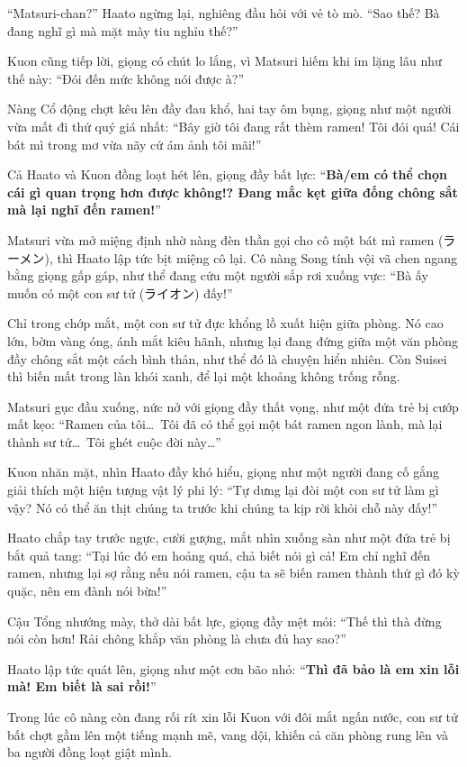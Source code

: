 \documentclass[../main.tex]{subfiles}
\begin{document}
``Matsuri-chan?'' Haato ngừng lại, nghiêng đầu hỏi với vẻ tò mò. ``Sao thế? Bà đang nghĩ gì mà mặt mày tiu nghỉu thế?''

Kuon cũng tiếp lời, giọng có chút lo lắng, vì Matsuri hiếm khi im lặng lâu như thế này: ``Đói đến mức không nói được à?''

Nàng Cổ động chợt kêu lên đầy đau khổ, hai tay ôm bụng, giọng như một người vừa mất đi thứ quý giá nhất: ``Bây giờ tôi đang rất thèm ramen! Tôi đói quá! Cái bát mì trong mơ vừa nãy cứ ám ảnh tôi mãi!''

Cả Haato và Kuon đồng loạt hét lên, giọng đầy bất lực: ``\textbf{Bà/em có thể chọn cái gì quan trọng hơn được không!? Đang mắc kẹt giữa đống chông sắt mà lại nghĩ đến ramen!}''

Matsuri vừa mở miệng định nhờ nàng đèn thần gọi cho cô một bát mì ramen (ラーメン), thì Haato lập tức bịt miệng cô lại. Cô nàng Song tính vội vã chen ngang bằng giọng gấp gáp, như thể đang cứu một người sắp rơi xuống vực: ``Bà ấy muốn có một con sư tử (ライオン) đấy!''

Chỉ trong chớp mắt, một con sư tử đực khổng lồ xuất hiện giữa phòng. Nó cao lớn, bờm vàng óng, ánh mắt kiêu hãnh, nhưng lại đang đứng giữa một văn phòng đầy chông sắt một cách bình thản, như thể đó là chuyện hiển nhiên. Còn Suisei thì biến mất trong làn khói xanh, để lại một khoảng không trống rỗng.

Matsuri gục đầu xuống, nức nở với giọng đầy thất vọng, như một đứa trẻ bị cướp mất kẹo: ``Ramen của tôi\dots\ Tôi đã có thể gọi một bát ramen ngon lành, mà lại thành sư tử\dots\ Tôi ghét cuộc đời này\dots''

Kuon nhăn mặt, nhìn Haato đầy khó hiểu, giọng như một người đang cố gắng giải thích một hiện tượng vật lý phi lý: ``Tự dưng lại đòi một con sư tử làm gì vậy? Nó có thể ăn thịt chúng ta trước khi chúng ta kịp rời khỏi chỗ này đấy!''

Haato chắp tay trước ngực, cười gượng, mắt nhìn xuống sàn như một đứa trẻ bị bắt quả tang: ``Tại lúc đó em hoảng quá, chả biết nói gì cả! Em chỉ nghĩ đến ramen, nhưng lại sợ rằng nếu nói ramen, cậu ta sẽ biến ramen thành thứ gì đó kỳ quặc, nên em đành nói bừa!''

Cậu Tổng nhướng mày, thở dài bất lực, giọng đầy mệt mỏi: ``Thế thì thà đừng nói còn hơn! Rải chông khắp văn phòng là chưa đủ hay sao?''

Haato lập tức quát lên, giọng như một cơn bão nhỏ: ``\textbf{Thì đã bảo là em xin lỗi mà! Em biết là sai rồi!}''

Trong lúc cô nàng còn đang rối rít xin lỗi Kuon với đôi mắt ngấn nước, con sư tử bất chợt gầm lên một tiếng mạnh mẽ, vang dội, khiến cả căn phòng rung lên và ba người đồng loạt giật mình.
\end{document}
